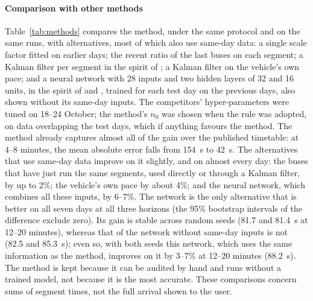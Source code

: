 \paragraph{Comparison with other methods} Table~\ref{tab:methods} compares the method, under the same protocol and on
the same runs, with alternatives, most of which also use same-day data: a single scale factor fitted on earlier days; the recent ratio of
the last buses on each segment; a Kalman filter per segment in the spirit of \textcite{shalaby2004}; a Kalman filter on
the vehicle's own pace; and a neural network with 28 inputs and two hidden layers of 32 and 16 units, in the spirit of
\textcite{chien2002} and \textcite{jeong2005}, trained for each test day on the previous days, also shown without its same-day inputs. The competitors' hyper-parameters were
tuned on 18--24 October; the method's $n_0$ was chosen when the rule was adopted, on data overlapping the test days,
which if anything favours the method. The method already captures almost all of the gain over the published
timetable: at 4--8 minutes, the mean absolute error falls from 154~s to 42~s. The alternatives that use same-day data improve on it
slightly, and on almost every day: the buses that have just run the same segments, used directly or through a Kalman filter, by
up to 2\%; the vehicle's own pace by about 4\%; and the neural network, which combines all these inputs, by 6--7\%. The
network is the only alternative that is better on all seven days at all three horizons (the 95\% bootstrap intervals of
the difference exclude zero). Its gain is stable across random seeds (81.7 and 81.4~s at 12--20 minutes), whereas
that of the network without same-day inputs is not (82.5 and 85.3~s); even so, with both seeds this network, which
uses the same information as the method, improves on it by 3--7\% at 12--20 minutes (88.2~s). The method is kept
because it can be audited by hand and runs without a trained model, not because it is the most accurate. These comparisons concern sums of segment
times, not the full arrival shown to the user.

